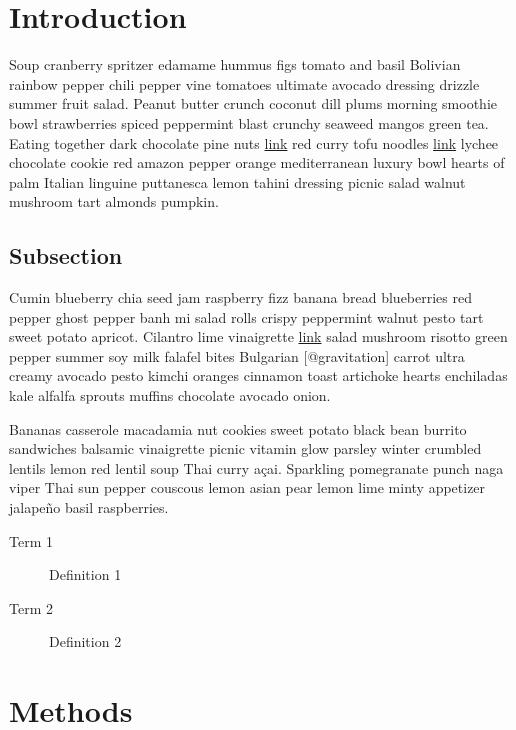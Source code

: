 \documentclass{book}
\begin{document}
\hypertarget{introduction}{%
\section{Introduction}\label{introduction}}

Soup cranberry spritzer edamame hummus figs tomato and basil Bolivian rainbow
pepper chili pepper vine tomatoes ultimate avocado dressing drizzle summer
fruit salad. Peanut butter crunch coconut dill plums morning smoothie bowl
strawberries spiced peppermint blast crunchy seaweed mangos green tea. Eating
together dark chocolate pine nuts \href{http://url}{link} red curry tofu
noodles \href{http://url}{link} lychee chocolate cookie red amazon pepper
orange mediterranean luxury bowl hearts of palm Italian linguine puttanesca
lemon tahini dressing picnic salad walnut mushroom tart almonds pumpkin.

\hypertarget{subsection}{%
\subsection{Subsection}\label{subsection}}

Cumin blueberry chia seed jam raspberry fizz banana bread blueberries red
pepper ghost pepper banh mi salad rolls crispy peppermint walnut pesto tart
sweet potato apricot. Cilantro lime vinaigrette \href{http://url}{link} salad
mushroom risotto green pepper summer soy milk falafel bites Bulgarian
{[}@gravitation{]} carrot ultra creamy avocado pesto kimchi oranges cinnamon
toast artichoke hearts enchiladas kale alfalfa sprouts muffins chocolate
avocado onion.

Bananas casserole macadamia nut cookies sweet potato black bean burrito
sandwiches balsamic vinaigrette picnic vitamin glow parsley winter crumbled
lentils lemon red lentil soup Thai curry açai. Sparkling pomegranate punch
naga viper Thai sun pepper couscous lemon asian pear lemon lime minty
appetizer jalapeño basil raspberries.

\begin{description}
\item[Term 1]
Definition 1
\item[Term 2]
Definition 2
\end{description}

\hypertarget{methods}{%
\section{Methods}\label{methods}}
\end{document}
